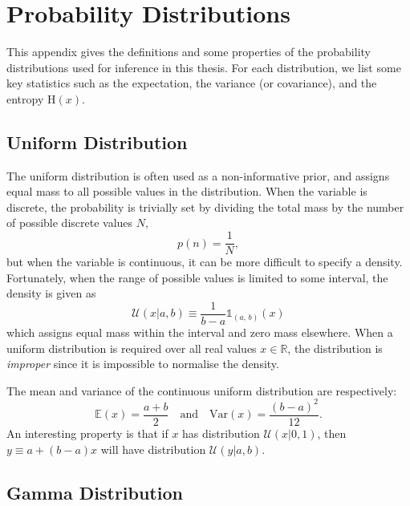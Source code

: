 \chapter{Probability Distributions}
\label{ch:probability-distributions}

\minitoc


This appendix gives the definitions and some properties of the probability distributions used for inference in this thesis. For each distribution, we list some key statistics such as the expectation, the variance (or covariance), and the entropy $\mathrm{H}(x)$.


\section{Uniform Distribution}
\label{sec:uniform-distribution}

The uniform distribution is often used as a non-informative prior, and assigns equal mass to all possible values in the distribution. When the variable is discrete, the probability is trivially set by dividing the total mass by the number of possible discrete values $N$,
\begin{equation}
	p(n) = \frac{1}{N},
\end{equation}
but when the variable is continuous, it can be more difficult to specify a density. Fortunately, when the range of possible values is limited to some interval, the density is given as
\begin{equation}
	\mathcal{U}(x|a, b)
	\equiv \frac{1}{b-a}\mathds{1}_{(a,\, b)}(x)
\end{equation}
which assigns equal mass within the interval and zero mass elsewhere. When a uniform distribution is required over all real values $x \in \mathbb{R}$, the distribution is \emph{improper} since it is impossible to normalise the density.

The mean and variance of the continuous uniform distribution are respectively:
\begin{equation}
\label{eq:uniform-moments}
	\mathbb{E}(x) = \frac{a+b}{2}
	\quad \text{and} \quad
	\mathrm{Var}(x) = \frac{(b-a)^2}{12}.
\end{equation}
An interesting property is that if $x$ has distribution $\mathcal{U}(x|0, 1)$, then $y \equiv a + (b-a)x$ will have distribution $\mathcal{U}(y|a, b)$.


\section{Gamma Distribution}

